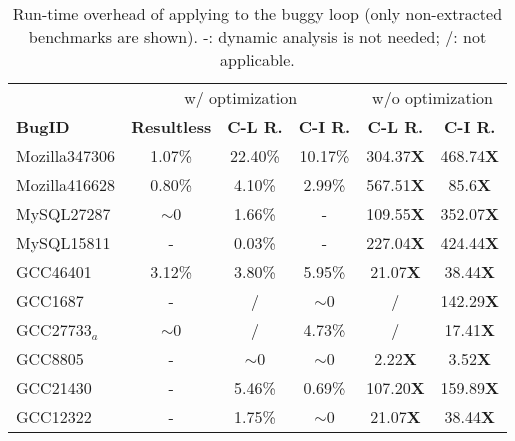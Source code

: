 \begin{table}
  \centering
  \scriptsize
  \newcommand{\Yes}[1]{\checkmark{}$_#1$}
  \newcommand{\No}[0]{-}
  \begin{tabular}{lccccc}
    \toprule
	    & \multicolumn{3}{c}{\Tool w/ optimization} & \multicolumn{2}{c}{w/o optimization} \\
     \cmidrule(lr){2-4}
     \cmidrule(lr){5-6}
     {\bf BugID}  & {\bf Resultless}  &  {\bf C-L R. } & {\bf C-I R. }  & {\bf C-L R.}  & {\bf C-I R. } \\
    \midrule
    Mozilla347306 &  1.07\%           &  22.40\%       &  10.17\%       & 304.37{\bf X} & 468.74{\bf X} \\ 
    Mozilla416628 &  0.80\%           &  4.10\%        &  2.99\%        & 567.51{\bf X} & 85.6{\bf X} \\
    \midrule
     MySQL27287   & $\sim$0           &   1.66\%       &   -            & 109.55{\bf X} & 352.07{\bf X} \\
     MySQL15811   &  -                &   0.03\%       &   -            & 227.04{\bf X} & 424.44{\bf X} \\
    \midrule
      GCC46401    & 3.12\%         & 3.80\%            &  5.95\%        & 21.07{\bf X}  & 38.44{\bf X}\\ 
      GCC1687     & -              & /                 &  $\sim$0       &   /           & 142.29{\bf X} \\
      GCC27733$_a$    & $\sim$0        & /                 &  4.73\%        &   /           & 17.41{\bf X}     \\
      GCC8805     & -              & $\sim$0           & $\sim$0        & 2.22{\bf X}   &  3.52{\bf X}\\
      GCC21430    & -              & 5.46\%            &   0.69\%       & 107.20{\bf X} & 159.89{\bf X} \\
      GCC12322    & -              & 1.75\%            &  $\sim$0       & 21.07{\bf X}  & 38.44{\bf X} \\
   \bottomrule
   \end{tabular}
  \caption{Run-time overhead of applying \Tool to the buggy loop
    (only non-extracted benchmarks are shown). 
  -: dynamic analysis is not needed;
  /: not applicable.}
  \label{tab:performance}
\end{table}


